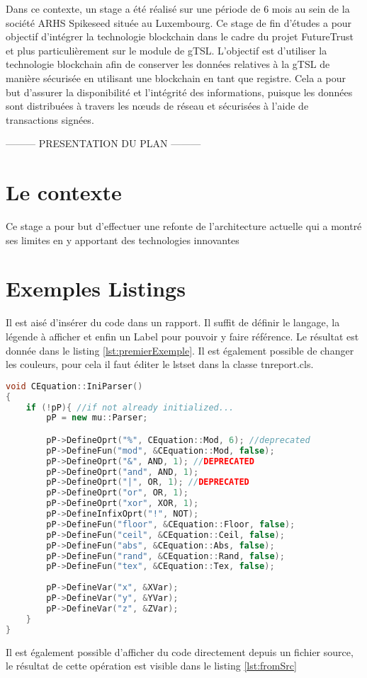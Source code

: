 \documentclass{tnreport}
\begin{document}
Dans ce contexte, un stage a été réalisé sur une période de 6 mois au sein de la société ARHS Spikeseed située au Luxembourg. 
Ce stage de fin d'études a pour objectif d'intégrer la technologie blockchain dans le cadre du projet FutureTrust et plus particulièrement sur le module de gTSL. 
L'objectif est d'utiliser la technologie blockchain afin de conserver les données relatives à la gTSL de manière sécurisée en utilisant une blockchain en tant que registre. 
Cela a pour but d'assurer la disponibilité et l'intégrité des informations, puisque les données sont distribuées à travers les nœuds de réseau et sécurisées à l'aide de transactions signées.


--------- PRESENTATION DU PLAN ---------

\cleardoublepage

\chapter{Le contexte}


Ce stage a pour but d'effectuer une refonte de l'architecture actuelle qui a montré ses limites en y apportant des technologies innovantes


\cleardoublepage

\chapter{Exemples Listings}

Il est aisé d'insérer du code dans un rapport. Il suffit de définir le langage, la légende à afficher et enfin un Label pour pouvoir y faire référence. Le résultat est donnée dans le listing \ref{lst:premierExemple}. Il est également possible de changer les couleurs, pour cela il faut éditer le lstset dans la classe tnreport.cls.

\begin{lstlisting}[language=c++, caption={Premier Exemple}, label={lst:premierExemple}]
void CEquation::IniParser()
{
	if (!pP){ //if not already initialized...
		pP = new mu::Parser;

		pP->DefineOprt("%", CEquation::Mod, 6); //deprecated
		pP->DefineFun("mod", &CEquation::Mod, false);
		pP->DefineOprt("&", AND, 1); //DEPRECATED
		pP->DefineOprt("and", AND, 1);
		pP->DefineOprt("|", OR, 1); //DEPRECATED
		pP->DefineOprt("or", OR, 1);
		pP->DefineOprt("xor", XOR, 1);
		pP->DefineInfixOprt("!", NOT);
		pP->DefineFun("floor", &CEquation::Floor, false);
		pP->DefineFun("ceil", &CEquation::Ceil, false);
		pP->DefineFun("abs", &CEquation::Abs, false);
		pP->DefineFun("rand", &CEquation::Rand, false);
		pP->DefineFun("tex", &CEquation::Tex, false);
	
		pP->DefineVar("x", &XVar);
		pP->DefineVar("y", &YVar);
		pP->DefineVar("z", &ZVar);
	}
}
\end{lstlisting}
\clearpage
Il est également possible d'afficher du code directement depuis un fichier source, le résultat de cette opération est visible dans le listing \ref{lst:fromSrc}

\end{document}
